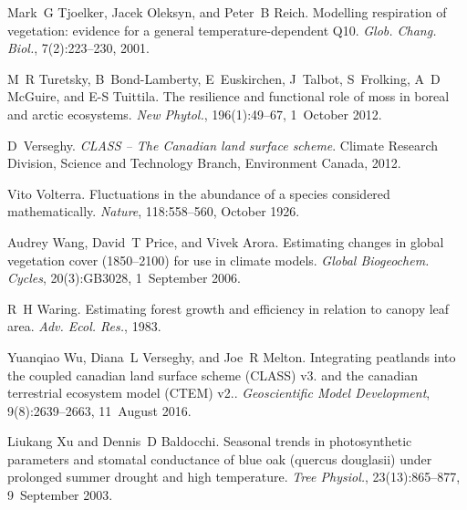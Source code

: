 \begin{DoxyDescription}
\item[\label{_CITEREF_Tjoelker2001-uz}%
\mbox{[}54\mbox{]}]Mark~G Tjoelker, Jacek Oleksyn, and Peter~B Reich. Modelling respiration of vegetation\+: evidence for a general temperature-\/dependent Q10. {\itshape Glob. Chang. Biol.}, 7(2)\+:223--230, 2001.


\item[\label{_CITEREF_Turetsky2012-qh}%
\mbox{[}55\mbox{]}]M~R Turetsky, B~Bond-\/\+Lamberty, E~Euskirchen, J~Talbot, S~Frolking, A~D Mc\+Guire, and E-\/\+S Tuittila. The resilience and functional role of moss in boreal and arctic ecosystems. {\itshape New Phytol.}, 196(1)\+:49--67, 1~October 2012. 


\item[\label{_CITEREF_Verseghy2012-c0e}%
\mbox{[}56\mbox{]}]D~Verseghy. {\itshape C\+L\+A\+S\+S -- The Canadian land surface scheme}. Climate Research Division, Science and Technology Branch, Environment Canada, 2012.


\item[\label{_CITEREF_Volterra1926-iz}%
\mbox{[}57\mbox{]}]Vito Volterra. Fluctuations in the abundance of a species considered mathematically. {\itshape Nature}, 118\+:558--560, October 1926. 


\item[\label{_CITEREF_Wang2006-he}%
\mbox{[}58\mbox{]}]Audrey Wang, David~T Price, and Vivek Arora. Estimating changes in global vegetation cover (1850–2100) for use in climate models. {\itshape Global Biogeochem. Cycles}, 20(3)\+:G\+B3028, 1~September 2006. 


\item[\label{_CITEREF_Waring1983-wc}%
\mbox{[}59\mbox{]}]R~H Waring. Estimating forest growth and efficiency in relation to canopy leaf area. {\itshape Adv. Ecol. Res.}, 1983. 


\item[\label{_CITEREF_Wu2016-zt}%
\mbox{[}60\mbox{]}]Yuanqiao Wu, Diana~L Verseghy, and Joe~R Melton. Integrating peatlands into the coupled canadian land surface scheme (C\+L\+A\+S\+S) v3. and the canadian terrestrial ecosystem model (C\+T\+E\+M) v2.. {\itshape Geoscientific Model Development}, 9(8)\+:2639--2663, 11~August 2016. 


\item[\label{_CITEREF_Xu2003-d75}%
\mbox{[}61\mbox{]}]Liukang Xu and Dennis~D Baldocchi. Seasonal trends in photosynthetic parameters and stomatal conductance of blue oak (quercus douglasii) under prolonged summer drought and high temperature. {\itshape Tree Physiol.}, 23(13)\+:865--877, 9~September 2003.


\end{DoxyDescription}